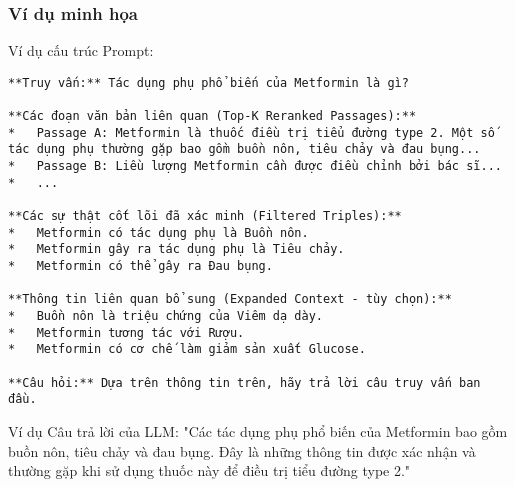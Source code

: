 \documentclass{article}
\begin{document}
\subsubsection{Ví dụ minh họa}
Ví dụ cấu trúc Prompt:

\begin{verbatim}
**Truy vấn:** Tác dụng phụ phổ biến của Metformin là gì?

**Các đoạn văn bản liên quan (Top-K Reranked Passages):**
*   Passage A: Metformin là thuốc điều trị tiểu đường type 2. Một số tác dụng phụ thường gặp bao gồm buồn nôn, tiêu chảy và đau bụng...
*   Passage B: Liều lượng Metformin cần được điều chỉnh bởi bác sĩ...
*   ...

**Các sự thật cốt lõi đã xác minh (Filtered Triples):**
*   Metformin có tác dụng phụ là Buồn nôn.
*   Metformin gây ra tác dụng phụ là Tiêu chảy.
*   Metformin có thể gây ra Đau bụng.

**Thông tin liên quan bổ sung (Expanded Context - tùy chọn):**
*   Buồn nôn là triệu chứng của Viêm dạ dày.
*   Metformin tương tác với Rượu.
*   Metformin có cơ chế làm giảm sản xuất Glucose.

**Câu hỏi:** Dựa trên thông tin trên, hãy trả lời câu truy vấn ban đầu.
\end{verbatim}

Ví dụ Câu trả lời của LLM: "Các tác dụng phụ phổ biến của Metformin bao gồm buồn nôn, tiêu chảy và đau bụng. Đây là những thông tin được xác nhận và thường gặp khi sử dụng thuốc này để điều trị tiểu đường type 2."
\end{document}
